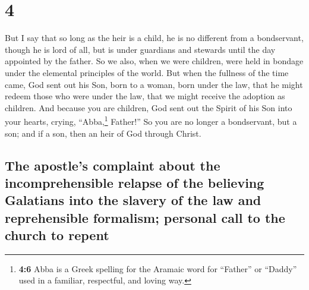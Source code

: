 \hypertarget{section-3}{%
\section{4}\label{section-3}}

 But I say that so long as the heir is a child, he is no
different from a bondservant, though he is lord of all, 
but is under guardians and stewards until the day appointed by the
father.  So we also, when we were children, were held in
bondage under the elemental principles of the world.  But
when the fullness of the time came, God sent out his Son, born to a
woman, born under the law,  that he might redeem those who
were under the law, that we might receive the adoption as children.
 And because you are children, God sent out the Spirit of
his Son into your hearts, crying, ``Abba,\footnote{\textbf{4:6} Abba is
  a Greek spelling for the Aramaic word for ``Father'' or ``Daddy'' used
  in a familiar, respectful, and loving way.} Father!'' 
So you are no longer a bondservant, but a son; and if a son, then an
heir of God through Christ.

\hypertarget{the-apostles-complaint-about-the-incomprehensible-relapse-of-the-believing-galatians-into-the-slavery-of-the-law-and-reprehensible-formalism-personal-call-to-the-church-to-repent}{%
\subsection{The apostle's complaint about the incomprehensible relapse
of the believing Galatians into the slavery of the law and reprehensible
formalism; personal call to the church to
repent}\label{the-apostles-complaint-about-the-incomprehensible-relapse-of-the-believing-galatians-into-the-slavery-of-the-law-and-reprehensible-formalism-personal-call-to-the-church-to-repent}}

